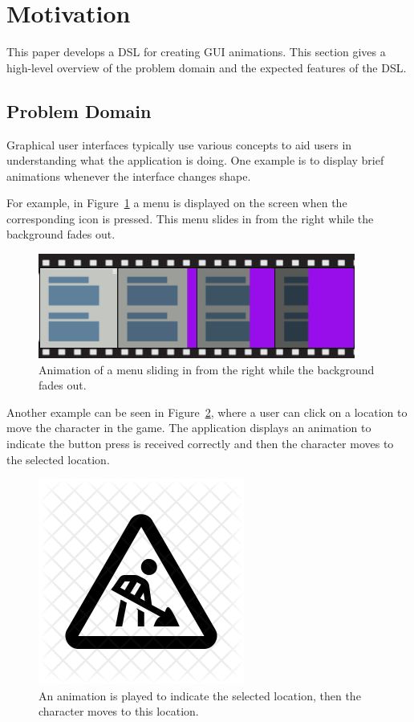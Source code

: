 \section{Motivation}
\label{sec:motivation}

This paper develops a DSL for creating GUI animations. This section gives a high-level overview of the problem domain and the expected features of the DSL.

\subsection{Problem Domain}

Graphical user interfaces typically use various concepts to aid users in understanding what the application is doing. One example is to display brief animations whenever the interface changes shape.

For example, in Figure~\ref{fig:usecase1} a menu is displayed on the screen when the corresponding icon is pressed. This menu slides in from the right while the background fades out.

\begin{figure}[H]
\centering
\includegraphics[scale=0.4]{pictures/usecase1fig.png}
\caption{Animation of a menu sliding in from the right while the background fades out.}
\label{fig:usecase1}
\end{figure}

Another example can be seen in Figure~\ref{fig:usecase2}, where a user can click on a location to move the character in the game. The application displays an animation to indicate the button press is received correctly and then the character moves to the selected location.

\begin{figure}[H]
\centering
\includegraphics[scale=0.4]{pictures/todo.png}
\caption{An animation is played to indicate the selected location, then the character moves to this location.}
\label{fig:usecase2}
\end{figure}

